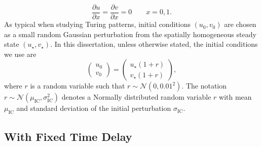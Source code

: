 \begin{equation}\label{neumannbc}
    \frac{\partial u}{\partial x}=\frac{\partial v}{\partial x}=0 \quad \quad x=0,1.
\end{equation}
As typical when studying Turing patterns, initial conditions $(u_0,v_0)$ are chosen as a small random Gaussian perturbation from the spatially homogeneous steady state $(u_\star,v_\star)$. In this dissertation, unless otherwise stated, the initial conditions we use are
\begin{equation}\label{firstic}
\begin{pmatrix}u_0\\v_0\end{pmatrix}=\begin{pmatrix}u_\star(1+r)\\v_\star(1+r)\end{pmatrix},
\end{equation}
where $r$ is a random variable such that $r\sim\mathcal{N}\left(0,0.01^2\right)$. The notation $r\sim\mathcal{N}\left(\mu_{\text{IC}},\sigma_{\text{IC}}^2\right)$ denotes a Normally distributed random variable $r$ with mean $\mu_{\text{IC}}$ and standard deviation of the initial perturbation $\sigma_{\text{IC}}$.

\subsection{With Fixed Time Delay}

